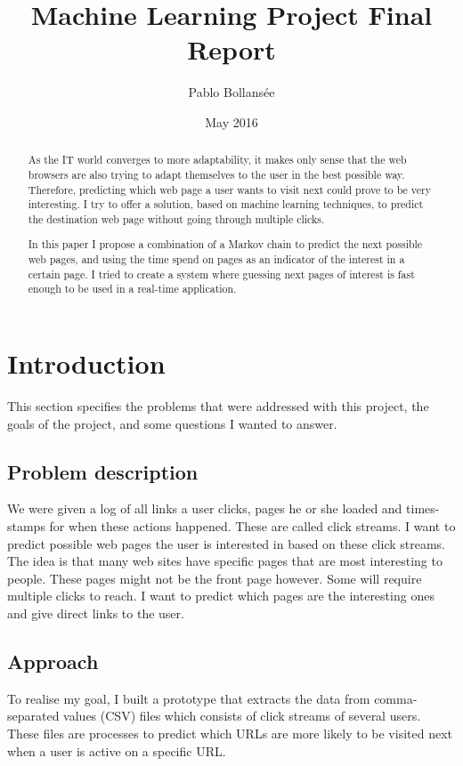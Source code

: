 \documentclass{article}
\title{Machine Learning Project Final Report}
\author{Pablo Bollansée}
\date{May 2016}
\begin{document}
\maketitle

\begin{abstract}
As the IT world converges to more adaptability, it makes only sense that the web browsers are also trying to adapt themselves to the user in the best possible way.
Therefore, predicting which web page a user wants to visit next could prove to be very interesting.
I try to offer a solution, based on machine learning techniques, to predict the destination web page without going through multiple clicks.

In this paper I propose a combination of a Markov chain to predict the next possible web pages, and using the time spend on pages as an indicator of the interest in a certain page.
I tried to create a system where guessing next pages of interest is fast enough to be used in a real-time application.
\end{abstract}

\section{Introduction}
This section specifies the problems that were addressed with this project, the goals of the project, and some questions I wanted to answer. 

\subsection{Problem description}
We were given a log of all links a user clicks, pages he or she loaded and times-stamps for when these actions happened. 
These are called click streams.
I want to predict possible web pages the user is interested in based on these click streams.
The idea is that many web sites have specific pages that are most interesting to people.
These pages might not be the front page however.
Some will require multiple clicks to reach.
I want to predict which pages are the interesting ones and give direct links to the user.

\subsection{Approach}
To realise my goal, I built a prototype that extracts the data from comma-separated values (CSV) files which consists of click streams of several users.
These files are processes to predict which URLs are more likely to be visited next when a user is active on a specific URL.
\end{document}
